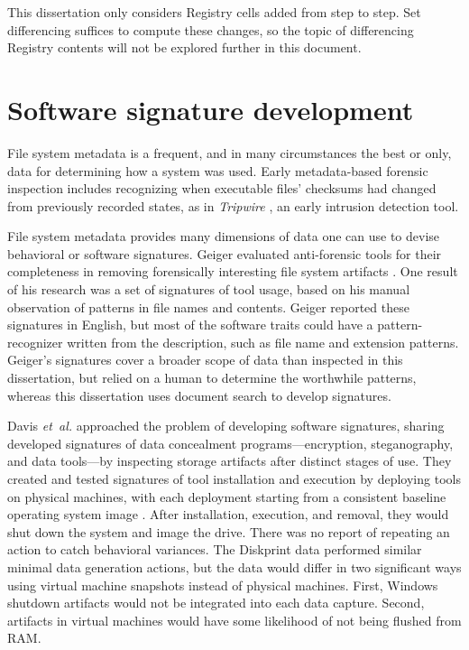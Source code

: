 \documentclass[11pt]{ucthesis}
\theoremstyle{plain}
\theoremstyle{definition}
\newcommand{\etal}{\emph{et~al.}\xspace}
\begin{document}
This dissertation only considers Registry cells added from step to step.  Set differencing suffices to compute these changes, so the topic of differencing Registry contents will not be explored further in this document.


\section{Software signature development}

File system metadata is a frequent, and in many circumstances the best or only, data for determining how a system was used.  Early metadata-based forensic inspection includes recognizing when executable files' checksums had changed from previously recorded states, as in \emph{Tripwire} \cite{kim:ccs94}, an early intrusion detection tool.

File system metadata provides many dimensions of data one can use to devise behavioral or software signatures.  Geiger evaluated anti-forensic tools for their completeness in removing forensically interesting file system artifacts \cite{geiger:dfrws05}.  One result of his research was a set of signatures of tool usage, based on his manual observation of patterns in file names and contents.  Geiger reported these signatures in English, but most of the software traits could have a pattern-recognizer written from the description, such as file name and extension patterns.  Geiger's signatures cover a broader scope of data than inspected in this dissertation, but relied on a human to determine the worthwhile patterns, whereas this dissertation uses document search to develop signatures.

Davis \etal approached the problem of developing software signatures, sharing developed signatures of data concealment programs---encryption, steganography, and data tools---by inspecting storage artifacts after distinct stages of use.  They created and tested signatures of tool installation and execution by deploying tools on physical machines, with each deployment starting from a consistent baseline operating system image \cite[Section 5]{davis:ifip06}.  After installation, execution, and removal, they would shut down the system and image the drive.  There was no report of repeating an action to catch behavioral variances.  The Diskprint data performed similar minimal data generation actions, but the data would differ in two significant ways using virtual machine snapshots instead of physical machines.  First, Windows shutdown artifacts would not be integrated into each data capture. Second, artifacts in virtual machines would have some likelihood of not being flushed from RAM.
\end{document}
